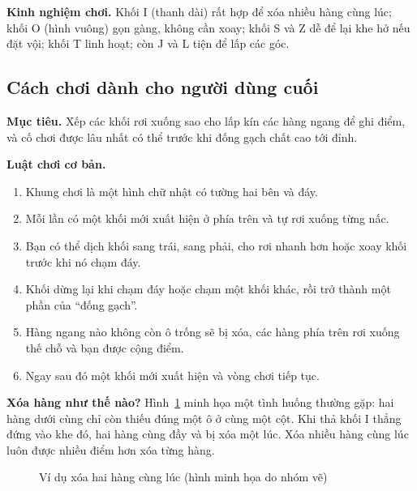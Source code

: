 \documentclass[13pt,a4paper]{extarticle}
\newcommand{\tetro}[3]{\foreach \x/\y in {#1}{%
  \fill[#2,draw=black!55,line width=0.3pt] (\x*#3,\y*#3) rectangle ++(#3,#3);}}
\begin{document}
\textbf{Kinh nghiệm chơi.} Khối I (thanh dài) rất hợp để xóa nhiều hàng cùng lúc; khối O (hình vuông) gọn gàng, không cần xoay; khối S và Z dễ để lại khe hở nếu đặt vội; khối T linh hoạt; còn J và L tiện để lấp các góc.

\subsection{Cách chơi dành cho người dùng cuối}
\textbf{Mục tiêu.} Xếp các khối rơi xuống sao cho lấp kín các hàng ngang để ghi điểm, và cố chơi được lâu nhất có thể trước khi đống gạch chất cao tới đỉnh.

\textbf{Luật chơi cơ bản.}
\begin{enumerate}
  \item Khung chơi là một hình chữ nhật có tường hai bên và đáy.
  \item Mỗi lần có một khối mới xuất hiện ở phía trên và tự rơi xuống từng nấc.
  \item Bạn có thể dịch khối sang trái, sang phải, cho rơi nhanh hơn hoặc xoay khối trước khi nó chạm đáy.
  \item Khối dừng lại khi chạm đáy hoặc chạm một khối khác, rồi trở thành một phần của ``đống gạch''.
  \item Hàng ngang nào không còn ô trống sẽ bị xóa, các hàng phía trên rơi xuống thế chỗ và bạn được cộng điểm.
  \item Ngay sau đó một khối mới xuất hiện và vòng chơi tiếp tục.
\end{enumerate}

\textbf{Xóa hàng như thế nào?} Hình~\ref{fig:xoahang} minh họa một tình huống thường gặp: hai hàng dưới cùng chỉ còn thiếu đúng một ô ở cùng một cột. Khi thả khối I thẳng đứng vào khe đó, hai hàng cùng đầy và bị xóa một lúc. Xóa nhiều hàng cùng lúc luôn được nhiều điểm hơn xóa từng hàng.

\begin{figure}[H]
\centering
{}
\caption{Ví dụ xóa hai hàng cùng lúc (hình minh họa do nhóm vẽ)}
\label{fig:xoahang}
\end{figure}
\end{document}
